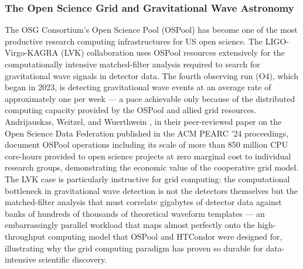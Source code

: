 \documentclass[12pt,a4paper]{report}
\begin{document}
     \subsubsection*{The Open Science Grid and Gravitational Wave Astronomy}
The OSG Consortium’s Open Science Pool (OSPool) has become one of the most productive research computing infrastructures for US open science. 
The LIGO-Virgo-KAGRA (LVK) collaboration uses OSPool resources extensively for the computationally intensive matched-filter analysis required
 to search for gravitational wave signals in detector data. The fourth observing run (O4), which began in 2023, is detecting gravitational wave 
 events at an average rate of approximately one per week — a pace achievable only because of the distributed computing capacity provided by the 
 OSPool and allied grid resources. Andrijauskas, Weitzel, and Wuerthwein \parencite{andrijauskas2024osdf}, in their peer-reviewed paper on the Open Science Data Federation 
 published in the ACM PEARC ’24 proceedings, document OSPool operations including its scale of more than 850 million CPU core-hours provided to open 
 science projects at zero marginal cost to individual research groups, demonstrating the economic value of the cooperative grid model. The LVK case 
 is particularly instructive for grid computing: the computational bottleneck in gravitational wave detection is not the detectors themselves but the 
 matched-filter analysis that must correlate gigabytes of detector data against banks of hundreds of thousands of theoretical waveform templates — an 
 embarrassingly parallel workload that maps almost perfectly onto the high-throughput computing model that OSPool and HTCondor were designed for, 
 illustrating why the grid computing paradigm has proven so durable for data-intensive scientific discovery.
\end{document}
